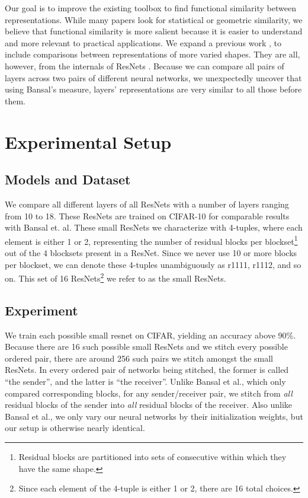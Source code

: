 \documentclass{article} %
\begin{document}
Our goal is to improve the existing toolbox to find functional similarity between representations.
While many papers \cite{Kornblith2019SimilarityON} \cite{Morcos2018InsightsOR} \cite{Ding2021GroundingRS}
look for statistical or geometric similarity, we believe that functional similarity is more salient
because it is easier to understand and more relevant to practical applications.
We expand a previous work
\cite{Bansal2021RevisitingMS}, to include comparisons between representations of more varied shapes. They
are all, however, from the internals of ResNets \cite{He2016DeepRL}.
Because we can compare all pairs of layers across
two pairs of different neural networks, we unexpectedly uncover that using Bansal's measure, layers'
representations are very similar to all those before them.

\section{Experimental Setup}
\label{ExperimentalSetup}
\subsection*{Models and Dataset}

We compare all different
layers of all ResNets with a number of layers ranging from 10 to 18.
These ResNets are trained on CIFAR-10 for comparable results
with Bansal et. al. These small ResNets we characterize with 4-tuples, where 
each element is either 1 or 2, representing the number of residual blocks per blockset\footnote{
   Residual blocks are partitioned into sets of consecutive within which they have the same shape.
} out of the 4 blocksets
present in a ResNet. Since we never use 10 or more blocks per blockset, we can denote these 4-tuples unambiguously as
r1111, r1112, and so on. This set of 16 ResNets\footnote{
   Since each element of the 4-tuple is either 1 or 2, there are 16 total choices.
} we refer to as the small ResNets.

\subsection*{Experiment}
We train each possible small resnet on CIFAR, yielding an accuracy above 90\%. Because 
there are 16 such possible
small ResNets and we stitch every possible ordered pair, there are around 256 such pairs we stitch amongst the small
ResNets. In every ordered pair of networks being stitched, the former is called ``the sender'', and the latter
is ``the receiver''. Unlike Bansal et al., which only compared corresponding blocks,
for any sender/receiver pair, we stitch from \textit{all} residual blocks of the sender into
\textit{all} residual blocks of the receiver. Also unlike Bansal et al., we only vary our neural networks by their
initialization weights, but our setup is otherwise nearly identical.
\end{document}
